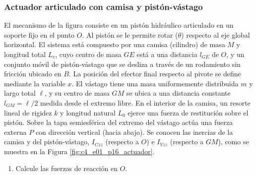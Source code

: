 \subsubsection{Actuador articulado con camisa y pistón-vástago}

El mecanismo de la figura consiste en un pistón hidráulico articulado en un soporte fijo en el
punto $O$. Al pistón se le permite rotar ($\theta$) respecto al eje global horizontal. El sistema
está compuesto por una camisa (cilindro) de masa $M$ y longitud total $L_c$, cuyo centro de masa
$GE$ está a una distancia $l_{GE}$ de $O$, y un conjunto móvil de pistón-vástago que se desliza a
través de un rodamiento sin fricción ubicado en $B$. La posición del efector final respecto al
pivote se define mediante la variable $x$. El vástago tiene una masa uniformemente distribuida $m$
y largo total $\ell$, y su centro de masa $GM$ se ubica a una distancia constante $l_{GM}=\ell/2$
medida desde el extremo libre. En el interior de la camisa, un resorte lineal de rigidez $k$ y
longitud natural $L_0$ ejerce una fuerza de restitución sobre el pistón. Sobre la tapa
semiesférica del extremo del vástago actúa una fuerza externa $P$ con dirección vertical (hacia
abajo). Se conocen las inercias de la camisa y del pistón-vástago, $I_{Czz}$ (respecto a $O$) e
$I_{Vzz}$ (respecto a $GM$), como se muestra en la Figura \ref{fig:c4_e01_p16_actuador}.

\begin{enumerate}
    \item Calcule las fuerzas de reacción en $O$.
\end{enumerate}

